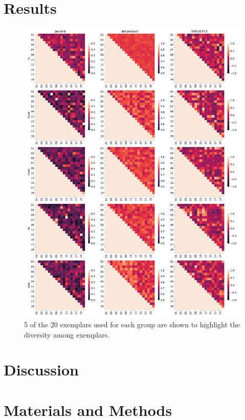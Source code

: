 \documentclass[11pt, twoside]{article}
\begin{document}
\section*{Results}

\begin{figure}[H]
	\centering
	\includegraphics[width=\linewidth]{./figures/similarity_comparison.pdf}
	\caption{5 of the 20 exemplars used for each group are shown to highlight the diversity among exemplars.}
	\label{fig:similarity_comparison}
\end{figure}


\section*{Discussion}

\section*{Materials and Methods}
\label{methods}
\end{document}

